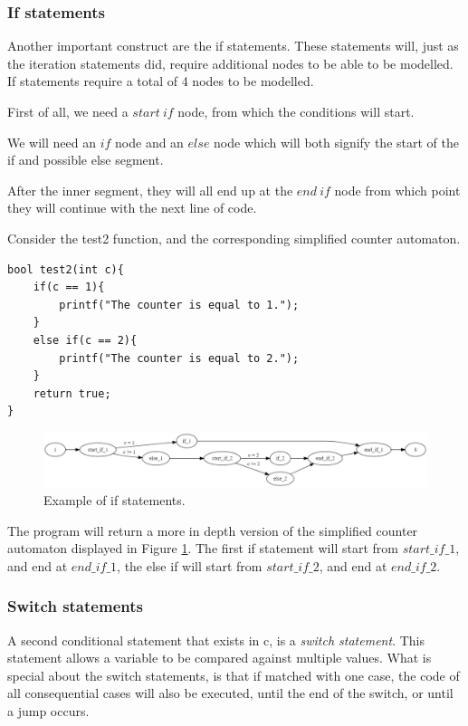 \documentclass[12pt]{article}
\begin{document}
\subsubsection{If statements}
\label{sec:if}
Another important construct are the if statements. These statements will, just as the iteration statements did, require additional nodes to be able to be modelled. If statements require a total of 4 nodes to be modelled.

First of all, we need a $start\ if$ node, from which the conditions will start.

We will need an $if$ node and an $else$ node which will both signify the start of the if and possible else segment.

After the inner segment, they will all end up at the $end\ if$ node from which point they will continue with the next line of code.

Consider the test2 function, and the corresponding simplified counter automaton.
\begin{lstlisting}[style=CStyle]
bool test2(int c){
	if(c == 1){
		printf("The counter is equal to 1.");
	}
	else if(c == 2){
		printf("The counter is equal to 2.");
	}
	return true;
}
\end{lstlisting}

\begin{figure}[h]
	\centering
	\includegraphics[width=\linewidth]{test2_counter_automaton}
	\caption{Example of if statements.}
	\label{fig:test2_counter_automaton}
\end{figure}

The program will return a more in depth version of the simplified counter automaton displayed in Figure \ref{fig:test2_counter_automaton}. The first if statement will start from $start\_if\_1$, and end at $end\_if\_1$, the else if will start from $start\_if\_2$, and end at $end\_if\_2$.

\subsubsection{Switch statements}
A second conditional statement that exists in c, is a \textit{switch statement}. This statement allows a variable to be compared against multiple values. What is special about the switch statements, is that if matched with one case, the code of all consequential cases will also be executed, until the end of the switch, or until a jump occurs.
\end{document}

